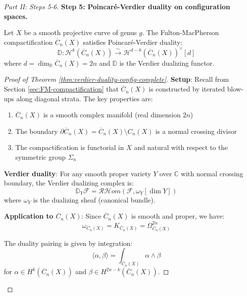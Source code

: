 \begin{proof}[Part II: Steps 5-6]

\textbf{Step 5: Poincaré-Verdier duality on configuration spaces.}

\begin{theorem}
\label{thm:verdier-duality-config-complete}
Let $X$ be a smooth projective curve of genus $g$. The Fulton-MacPherson 
compactification $\overline{C}_n(X)$ satisfies Poincaré-Verdier duality:
\begin{equation}
\mathbb{D}: \mathcal{H}^k(\overline{C}_n(X)) \xrightarrow{\sim} \mathcal{H}^{d-k}(
\overline{C}_n(X))^\vee[d]
\end{equation}
where $d = \dim_{\mathbb{R}} \overline{C}_n(X) = 2n$ and $\mathbb{D}$ is the Verdier 
dualizing functor.
\end{theorem}

\begin{proof}[Proof of Theorem \ref{thm:verdier-duality-config-complete}]
\textbf{Setup}: Recall from Section \ref{sec:FM-compactification} that $\overline{C}_n(X)$ 
is constructed by iterated blow-ups along diagonal strata. The key properties are:
\begin{enumerate}
\item $\overline{C}_n(X)$ is a smooth complex manifold (real dimension $2n$)
\item The boundary $\partial \overline{C}_n(X) = \overline{C}_n(X) \setminus C_n(X)$ 
is a normal crossing divisor
\item The compactification is functorial in $X$ and natural with respect to the 
symmetric group $\Sigma_n$
\end{enumerate}

\textbf{Verdier duality}: For any smooth proper variety $Y$ over $\mathbb{C}$ with 
normal crossing boundary, the Verdier dualizing complex is:
\begin{equation}
\mathbb{D}_Y \mathcal{F} = \mathcal{RH}om(\mathcal{F}, \omega_Y[\dim Y])
\end{equation}
where $\omega_Y$ is the dualizing sheaf (canonical bundle).

\textbf{Application to $\overline{C}_n(X)$}: Since $\overline{C}_n(X)$ is smooth and 
proper, we have:
\begin{equation}
\omega_{\overline{C}_n(X)} = K_{\overline{C}_n(X)} = \Omega^{2n}_{\overline{C}_n(X)}
\end{equation}

The duality pairing is given by integration:
\begin{equation}
\langle \alpha, \beta \rangle = \int_{\overline{C}_n(X)} \alpha \wedge \beta
\end{equation}
for $\alpha \in H^k(\overline{C}_n(X))$ and $\beta \in H^{2n-k}(\overline{C}_n(X))$.


\end{proof}
\end{proof}
